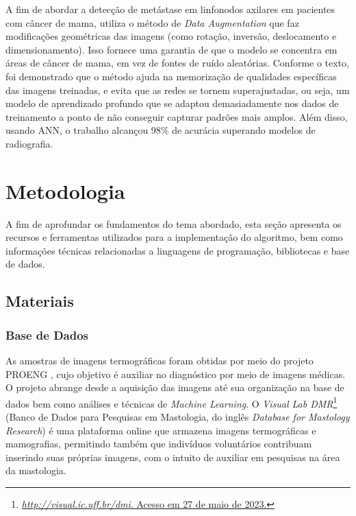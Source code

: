 A fim de abordar a detecção de metástase em linfonodos axilares em pacientes com câncer de mama,  utiliza o método de \textit{Data Augmentation} que faz modificações geométricas das imagens (como rotação, inversão, deslocamento e dimensionamento). Isso fornece uma garantia de que o modelo se concentra em áreas de câncer de mama, em vez de fontes de ruído aleatórias. Conforme o texto, foi demonstrado que o método ajuda na memorização de qualidades específicas das imagens treinadas, e evita que as redes se tornem superajustadas, ou seja, um modelo de aprendizado profundo que se adaptou demasiadamente nos dados de treinamento a ponto de não conseguir capturar padrões mais amplos. Além disso, usando ANN, o trabalho alcançou 98\% de acurácia superando modelos de radiografia.




\section{\esp Metodologia} \label{metodologia}
A fim de aprofundar os fundamentos do tema abordado, esta seção apresenta os recursos e ferramentas utilizados para a implementação do algoritmo, bem como informações técnicas relacionadas a linguagens de programação, bibliotecas e base de dados.



\subsection{\esp Materiais} \label{materiais}


\subsubsection{\esp Base de Dados} \label{database}

As amostras de imagens termográficas foram obtidas por meio do projeto PROENG , cujo objetivo é auxiliar no diagnóstico por meio de imagens médicas. O projeto abrange desde a aquisição das imagens até sua organização na base de dados bem como análises e técnicas de \textit{Machine Learning}. O \textit{Visual Lab DMR}\footnote{\href{http://visual.ic.uff.br/dmi}{\textit{http://visual.ic.uff.br/dmi}. Acesso em 27 de maio de 2023.}} (Banco de Dados para Pesquisas em Mastologia, do inglês \textit{Database for Mastology Research}) é uma plataforma online que armazena imagens termográficas e mamografias, permitindo também que indivíduos voluntários contribuam inserindo suas próprias imagens, com o intuito de auxiliar em pesquisas na área da mastologia.

